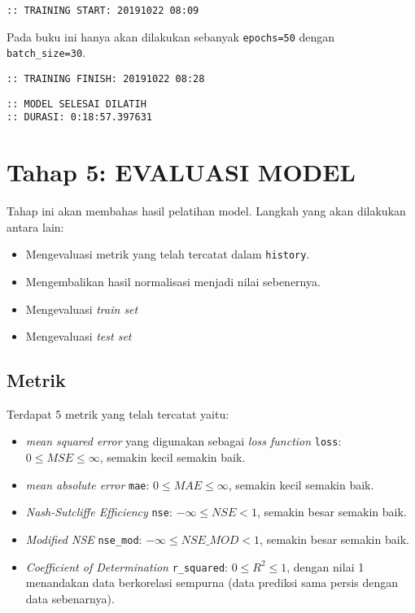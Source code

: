 \documentclass[11pt]{article}
\providecommand{\tightlist}{%
      \setlength{\itemsep}{0pt}\setlength{\parskip}{0pt}}
\let\oldsection\section
\renewcommand\section{\clearpage\oldsection}
\begin{document}
    \begin{Verbatim}[commandchars=\\\{\}]
:: TRAINING START: 20191022 08:09
    \end{Verbatim}

    Pada buku ini hanya akan dilakukan sebanyak \texttt{epochs=50} dengan
\texttt{batch\_size=30}.

    \begin{Verbatim}[commandchars=\\\{\}]
:: TRAINING FINISH: 20191022 08:28
    \end{Verbatim}

    \begin{Verbatim}[commandchars=\\\{\}]
:: MODEL SELESAI DILATIH
:: DURASI: 0:18:57.397631
    \end{Verbatim}

    \hypertarget{tahap-5-evaluasi-model}{%
\section{Tahap 5: EVALUASI MODEL}\label{tahap-5-evaluasi-model}}

Tahap ini akan membahas hasil pelatihan model. Langkah yang akan
dilakukan antara lain:

\begin{itemize}
\tightlist
\item
  Mengevaluasi metrik yang telah tercatat dalam \texttt{history}.
\item
  Mengembalikan hasil normalisasi menjadi nilai sebenernya.
\item
  Mengevaluasi \emph{train set}
\item
  Mengevaluasi \emph{test set}
\end{itemize}

    \hypertarget{metrik}{%
\subsection{Metrik}\label{metrik}}

    Terdapat 5 metrik yang telah tercatat yaitu:

\begin{itemize}
\tightlist
\item
  \emph{mean squared error} yang digunakan sebagai \emph{loss function}
  \texttt{loss}: \(0 \leq MSE \leq \infty\), semakin kecil semakin baik.
\item
  \emph{mean absolute error} \texttt{mae}: \(0 \leq MAE \leq \infty\),
  semakin kecil semakin baik.
\item
  \emph{Nash-Sutcliffe Efficiency} \texttt{nse}:
  \(-\infty \leq NSE < 1\), semakin besar semakin baik.
\item
  \emph{Modified NSE} \texttt{nse\_mod}: \(-\infty \leq NSE\_MOD < 1\),
  semakin besar semakin baik.
\item
  \emph{Coefficient of Determination} \texttt{r\_squared}:
  \(0 \leq R^2 \leq 1\), dengan nilai 1 menandakan data berkorelasi
  sempurna (data prediksi sama persis dengan data sebenarnya).
\end{itemize}
\end{document}
